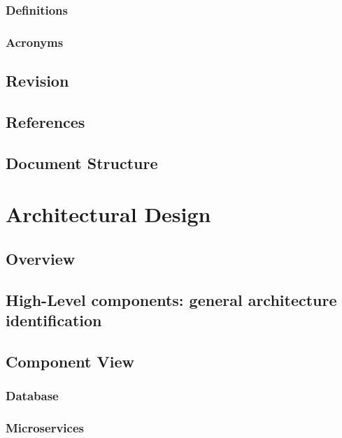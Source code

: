 \documentclass[12pt]{article}
\begin{document}
\subsubsection{Definitions}


\subsubsection{Acronyms}


\subsection{Revision}

\subsection{References}


\subsection{Document Structure}

\clearpage

\section{Architectural Design}

\subsection{Overview}

\subsection{High-Level components: general architecture identification}\label{higharch}

\subsection{Component View}\label{componentview}
\subsubsection{Database}

\subsubsection{Microservices}

\clearpage
\end{document}
